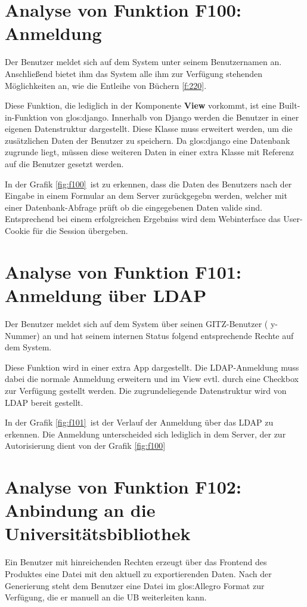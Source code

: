\section{Analyse von Funktion F100: Anmeldung}
Der Benutzer meldet sich auf dem System unter seinem Benutzernamen an.
Anschließend bietet ihm das System alle ihm zur Verfügung stehenden
Möglichkeiten an, wie \zB die Entleihe von Büchern \ref{f:220}.


Diese Funktion, die lediglich in der Komponente \textbf{View} vorkommt, ist
eine Built-in-Funktion von \gls{glos:django}. Innerhalb von Django werden die Benutzer
in einer eigenen Datenstruktur  dargestellt. Diese Klasse muss erweitert werden,
um die zusätzlichen Daten der Benutzer zu speichern. Da \gls{glos:django} eine Datenbank
zugrunde liegt, müssen diese weiteren Daten in einer extra Klasse mit Referenz
auf die Benutzer gesetzt werden.


In der Grafik \ref{fig:f100}\ ist zu erkennen, dass die Daten des Benutzers nach
der Eingabe in einem Formular an dem Server zurückgegebn werden, welcher mit
einer Datenbank-Abfrage prüft ob die eingegebenen Daten valide sind.
Entsprechend bei einem erfolgreichen Ergebniss wird dem Webinterface das
User-Cookie für die Session übergeben.


\section{Analyse von Funktion F101: Anmeldung über LDAP}
Der Benutzer meldet sich auf dem System über seinen \Gls{GITZ}-Benutzer (\zB
y-Nummer) an und hat seinem internen Status folgend entsprechende Rechte auf dem
System.


Diese Funktion wird in einer extra App dargestellt. Die \gls{LDAP}-Anmeldung muss
dabei die normale Anmeldung erweitern und im View evtl. durch eine Checkbox zur
Verfügung gestellt werden. Die zugrundeliegende Datenstruktur wird von \gls{LDAP}
bereit gestellt.

In der Grafik \ref{fig:f101}\ ist der Verlauf der Anmeldung über das \gls{LDAP} zu
erkennen. Die Anmeldung unterscheided sich lediglich in dem Server, der zur
Autorisierung dient von der Grafik \ref{fig:f100}

\section{Analyse von Funktion F102: Anbindung an die Universitätsbibliothek}
Ein Benutzer mit hinreichenden Rechten erzeugt über das Frontend des Produktes
eine Datei mit den aktuell zu exportierenden Daten. Nach der Generierung steht
dem Benutzer eine Datei im \gls{glos:Allegro} Format zur Verfügung, die er
manuell an die \gls{UB} weiterleiten kann.


